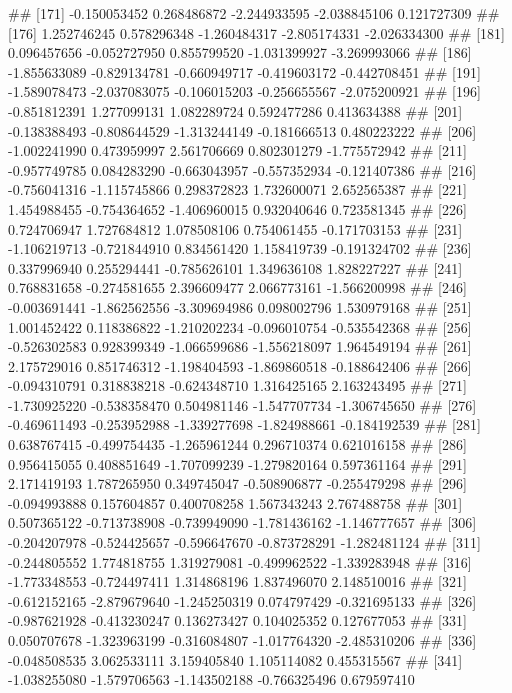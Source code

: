 \documentclass[
]{article}
\begin{document}
\begin{enumerate}[label=(\alph*)]
##  [171] -0.150053452  0.268486872 -2.244933595 -2.038845106  0.121727309
##  [176]  1.252746245  0.578296348 -1.260484317 -2.805174331 -2.026334300
##  [181]  0.096457656 -0.052727950  0.855799520 -1.031399927 -3.269993066
##  [186] -1.855633089 -0.829134781 -0.660949717 -0.419603172 -0.442708451
##  [191] -1.589078473 -2.037083075 -0.106015203 -0.256655567 -2.075200921
##  [196] -0.851812391  1.277099131  1.082289724  0.592477286  0.413634388
##  [201] -0.138388493 -0.808644529 -1.313244149 -0.181666513  0.480223222
##  [206] -1.002241990  0.473959997  2.561706669  0.802301279 -1.775572942
##  [211] -0.957749785  0.084283290 -0.663043957 -0.557352934 -0.121407386
##  [216] -0.756041316 -1.115745866  0.298372823  1.732600071  2.652565387
##  [221]  1.454988455 -0.754364652 -1.406960015  0.932040646  0.723581345
##  [226]  0.724706947  1.727684812  1.078508106  0.754061455 -0.171703153
##  [231] -1.106219713 -0.721844910  0.834561420  1.158419739 -0.191324702
##  [236]  0.337996940  0.255294441 -0.785626101  1.349636108  1.828227227
##  [241]  0.768831658 -0.274581655  2.396609477  2.066773161 -1.566200998
##  [246] -0.003691441 -1.862562556 -3.309694986  0.098002796  1.530979168
##  [251]  1.001452422  0.118386822 -1.210202234 -0.096010754 -0.535542368
##  [256] -0.526302583  0.928399349 -1.066599686 -1.556218097  1.964549194
##  [261]  2.175729016  0.851746312 -1.198404593 -1.869860518 -0.188642406
##  [266] -0.094310791  0.318838218 -0.624348710  1.316425165  2.163243495
##  [271] -1.730925220 -0.538358470  0.504981146 -1.547707734 -1.306745650
##  [276] -0.469611493 -0.253952988 -1.339277698 -1.824988661 -0.184192539
##  [281]  0.638767415 -0.499754435 -1.265961244  0.296710374  0.621016158
##  [286]  0.956415055  0.408851649 -1.707099239 -1.279820164  0.597361164
##  [291]  2.171419193  1.787265950  0.349745047 -0.508906877 -0.255479298
##  [296] -0.094993888  0.157604857  0.400708258  1.567343243  2.767488758
##  [301]  0.507365122 -0.713738908 -0.739949090 -1.781436162 -1.146777657
##  [306] -0.204207978 -0.524425657 -0.596647670 -0.873728291 -1.282481124
##  [311] -0.244805552  1.774818755  1.319279081 -0.499962522 -1.339283948
##  [316] -1.773348553 -0.724497411  1.314868196  1.837496070  2.148510016
##  [321] -0.612152165 -2.879679640 -1.245250319  0.074797429 -0.321695133
##  [326] -0.987621928 -0.413230247  0.136273427  0.104025352  0.127677053
##  [331]  0.050707678 -1.323963199 -0.316084807 -1.017764320 -2.485310206
##  [336] -0.048508535  3.062533111  3.159405840  1.105114082  0.455315567
##  [341] -1.038255080 -1.579706563 -1.143502188 -0.766325496  0.679597410

\end{enumerate}
\end{document}
